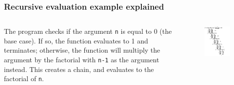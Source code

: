 \documentclass{beamer}
\begin{document}
\begin{frame}[fragile]
	\frametitle{Recursive evaluation example explained}

	\begin{columns}[c] %
		
		The program checks if the argument \texttt{n} is equal to 0 (the base case). If so, the function evaluates to 1 and terminates; otherwise, the function will multiply the argument by the factorial with \texttt{n-1} as the argument instead. This creates a chain, and evaluates to the factorial of \texttt{n}.
		
		\begin{figure}
			\includegraphics[width=1\linewidth]{../img/factorial}
		\end{figure}

	\end{columns}

\end{frame}


\end{document}
